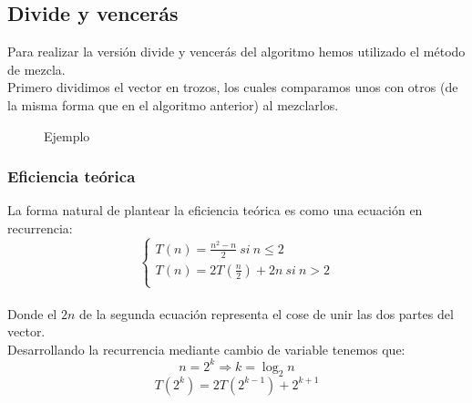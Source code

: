 \newpage

\subsection{Divide y vencerás}
Para realizar la versión divide y vencerás del algoritmo hemos utilizado el método de mezcla.\\

Primero dividimos el vector en trozos, los cuales comparamos unos con otros (de la misma forma que en el algoritmo anterior) al mezclarlos.\\


\begin{figure}[h] 
\centering
	\caption{Ejemplo} 
\end{figure}


\subsubsection{Eficiencia teórica}
La forma natural de plantear la eficiencia teórica es como una ecuación en recurrencia:\\

$$\left\lbrace
	\begin{array}{l}
	T(n) = \frac{n^2 - n}{2}\  si\ n \leq 2\\
	T(n) = 2T(\frac{n}{2}) + 2n\  si\ n > 2 \\
	\end{array}
	\right.$$\\
	
Donde el $2n$ de la segunda ecuación representa el cose de unir las dos partes del vector.\\

Desarrollando la recurrencia mediante cambio de variable tenemos que:\\

$$n=2^k \Rightarrow k = \log_2n$$
$$T(2^k) = 2T(2^{k-1}) + 2^{k+1}$$\\

